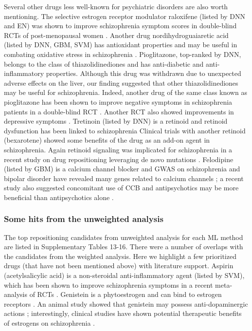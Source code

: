       Several other drugs less well-known for psychiatric disorders are also worth mentioning. The selective estrogen receptor modulator raloxifene (listed by DNN and EN) was shown to improve schizophrenia symptom scores in double-blind RCTs of post-menopausal women \cite{usall2011raloxifene,usall2016raloxifene}. Another drug nordihydroguaiaretic acid (listed by DNN, GBM, SVM) has antioxidant properties \cite{lu2010molecular} and may be useful in combating oxidative stress in schizophrenia \cite{wu2013free}. Pioglitazone, top-ranked by DNN, belongs to the class of thiazolidinediones and has anti-diabetic and anti-inflammatory properties. Although this drug was withdrawn due to unexpected adverse effects on the liver, our finding suggested that other thiazolidinediones may be useful for schizophrenia. Indeed, another drug of the same class known as pioglitazone has been shown to improve negative symptoms in schizophrenia patients in a double-blind RCT \cite{iranpour2016effects}. Another RCT also showed improvements in depressive symptoms \cite{smith2013effects}. Tretinoin (listed by DNN) is a retinoid and retinoid dysfunction has been linked to schizophrenia \cite{goodman1998three,lerner2016targeting} Clinical trials with another retinoid (bexarotene) showed some benefits of the drug as an add-on agent in schizophrenia. Again retinoid signaling was implicated for schizophrenia in a recent study on drug repositioning leveraging de novo mutations \cite{so2019implications}. Felodipine (listed by GBM) is a calcium channel blocker and GWAS on schizophrenia and bipolar disorder have revealed many genes related to calcium channels \cite{heyes2015genetic,cipriani2016systematic}; a recent study also suggested concomitant use of CCB and antipsychotics may be more beneficial than antipsychotics alone \cite{van2018concomitant}.
  
    \subsubsection{Some hits from the unweighted analysis}
      The top repositioning candidates from unweighted analysis for each ML method are listed in Supplementary Tables 13-16. There were a number of overlaps with the candidates from the weighted analysis. Here we highlight a few prioritized drugs (that have not been mentioned above) with literature support. Aspirin (acetylsalicylic acid) is a non-steroidal anti-inflammatory agent (listed by SVM), which has been shown to improve schizophrenia symptoms in a recent meta-analysis of RCTs \cite{sommer2014efficacy}. Genistein is a phytoestrogen and can bind to estrogen receptors \cite{wang1996molecular}. An animal study showed that genistein may possess anti-dopaminergic actions \cite{suresh2013antidopaminergic}; interestingly, clinical studies have shown potential therapeutic benefits of estrogens on schizophrenia \cite{sommer2014efficacy}.

